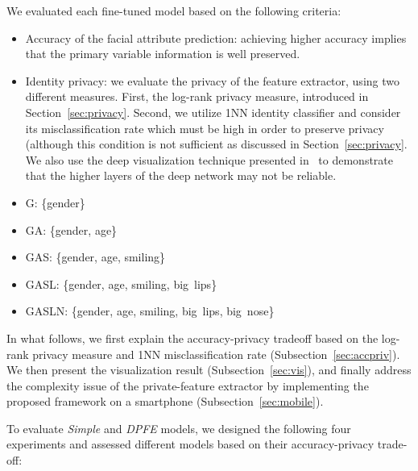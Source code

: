 \documentclass[10pt,journal,compsoc]{IEEEtran}
\begin{document}
We evaluated each fine-tuned model based on the following criteria:
\begin{itemize}
\item Accuracy of the facial attribute prediction: achieving higher accuracy implies that the primary variable information is well preserved.
\item Identity privacy: we evaluate the privacy of the feature extractor, using two different measures. First, the log-rank privacy measure, introduced in Section~\ref{sec:privacy}. Second, we utilize 1NN identity classifier and consider its misclassification rate which must be high in order to preserve privacy (although this condition is not sufficient as discussed in Section~\ref{sec:privacy}. We also use the deep visualization technique presented in~\cite{dosovitskiy2016} to demonstrate that the higher layers of the deep network may not be reliable.
\end{itemize}%
\begin{itemize}
	\item G: \{gender\}
	\item GA: \{gender, age\}
	\item GAS: \{gender, age, smiling\}
	\item GASL: \{gender, age, smiling, big~lips\}
	\item GASLN: \{gender, age, smiling, big~lips, big~nose\}
\end{itemize}In what follows, we first explain the accuracy-privacy tradeoff based on the log-rank privacy measure and 1NN misclassification rate (Subsection~\ref{sec:accpriv}). We then present the visualization result (Subsection~\ref{sec:vis}), and finally address the complexity issue of the private-feature extractor by implementing the proposed framework on a smartphone (Subsection~\ref{sec:mobile}). 


To evaluate \emph{Simple} and \emph{DPFE} models, we designed the following four experiments and assessed different models based on their accuracy-privacy trade-off:
\end{document}
